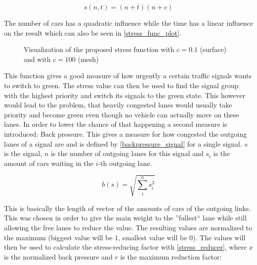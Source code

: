 \begin{equation} \label{proposed_stress}
	s(n, t) = (n + t)(n + c)
\end{equation}

The number of cars has a quadratic influence while the time has a linear influence on the result which can also be seen in \autoref{stress_func_plot}.

\begin{figure}[h!]
	\centering
	\label{stress_func_plot}
	\caption{Visualization of the proposed stress function with $c = 0.1$ (surface) and with $c = 100$ (mesh)}
\end{figure}

This function gives a good measure of how urgently a certain traffic signals wants to switch to green. The stress value can then be used to find the signal group with the highest priority and switch its signals to the green state. This however would lead to the problem, that heavily congested lanes would usually take priority and become green even though no vehicle can actually move on these lanes. In order to lower the chance of that happening a second measure is introduced: Back pressure. This gives a measure for how congested the outgoing lanes of a signal are and is defined by \autoref{backpressure_signal} for a single signal. $s$ is the signal, $n$ is the number of outgoing lanes for this signal and $s_i$ is the amount of cars waiting in the $i$-th outgoing lane.

\begin{equation} \label{backpressure_signal}
b(s) = \sqrt{\sum_{i}^{n}{s_{i}^2}}
\end{equation}

This is basically the length of vector of the amounts of cars of the outgoing links. This was chosen in order to give the main weight to the ''fullest`` lane while still allowing the free lanes to reduce the value. The resulting values are normalized to the maximum (biggest value will be $1$, smallest value will be $0$). The values will then be used to calculate the stress-reducing factor with \autoref{stress_reducer}, where $x$ is the normalized back pressure and $r$ is the maximum reduction factor:

